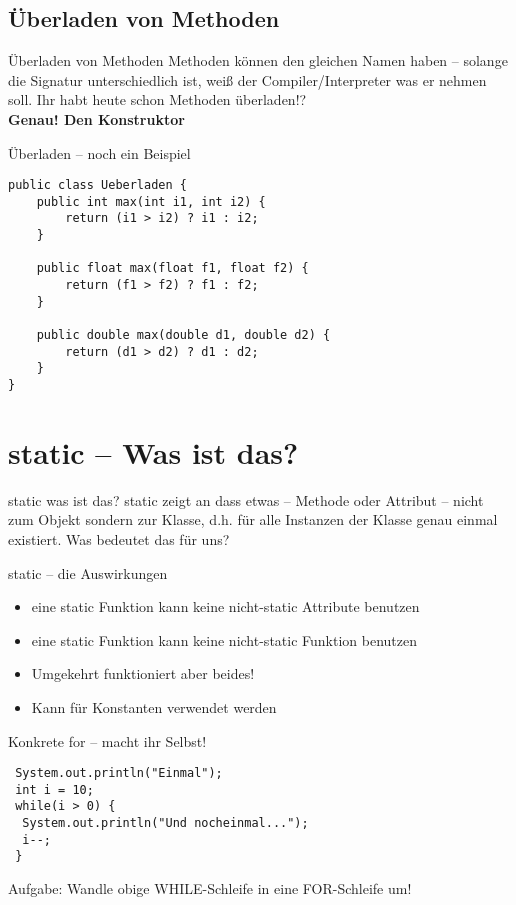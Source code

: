 \documentclass[18pt]{beamer}
\begin{document}
\subsection{Überladen von Methoden}
\begin{frame}{Überladen von Methoden}
 Methoden können den gleichen Namen haben – solange die Signatur unterschiedlich ist, weiß der Compiler/Interpreter was er nehmen soll.
 Ihr habt heute schon Methoden überladen!? \\ \pause
 \textbf{Genau! Den Konstruktor}
\end{frame}

\begin{frame}[fragile]{Überladen – noch ein Beispiel}
 \begin{lstlisting}
public class Ueberladen {
    public int max(int i1, int i2) { 
        return (i1 > i2) ? i1 : i2; 
    }
   
    public float max(float f1, float f2) { 
        return (f1 > f2) ? f1 : f2; 
    }
    
    public double max(double d1, double d2) { 
        return (d1 > d2) ? d1 : d2; 
    }
} 
 \end{lstlisting}
\end{frame}

\section{static – Was ist das?}
\begin{frame}{static was ist das?}
 static zeigt an dass etwas – Methode oder Attribut – nicht zum Objekt sondern zur Klasse, d.h. für alle Instanzen der Klasse genau einmal existiert.
 Was bedeutet das für uns?
\end{frame}

\begin{frame}{static – die Auswirkungen}
\begin{itemize}
 \item eine static Funktion kann keine nicht-static Attribute benutzen
 \item eine static Funktion kann keine nicht-static Funktion benutzen
 \item Umgekehrt funktioniert aber beides!
 \item Kann für Konstanten verwendet werden
\end{itemize}
 

\end{frame}


\begin{frame}[fragile]{Konkrete for – macht ihr Selbst!}
 \begin{lstlisting}
 System.out.println("Einmal");
 int i = 10;
 while(i > 0) {
  System.out.println("Und nocheinmal...");
  i--;
 }
 \end{lstlisting}
 Aufgabe: Wandle obige WHILE-Schleife in eine FOR-Schleife um!
\end{frame}
\end{document}
